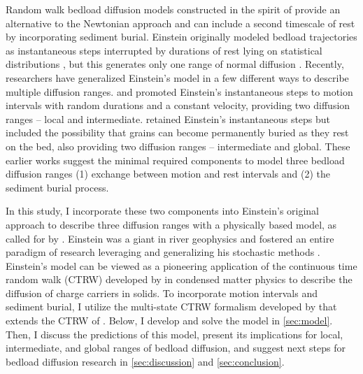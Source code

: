 Random walk bedload diffusion models constructed in the spirit of \citet{Einstein1937} provide an alternative to the Newtonian approach and can include a second timescale of rest by incorporating sediment burial.
Einstein originally modeled bedload trajectories as instantaneous steps interrupted by durations of rest lying on statistical distributions \citep{Hassan1991}, but this generates only one range of normal diffusion \citep{Einstein1937,Hubbell1964,Nakagawa1976}.
Recently, researchers have generalized Einstein's model in a few different ways to describe multiple diffusion ranges.
\citet{Lisle1998} and \citet{Lajeunesse2017} promoted Einstein's instantaneous steps to motion intervals with random durations and a constant velocity, providing two diffusion ranges -- local and intermediate.
\citet{Wu2019} retained Einstein's instantaneous steps but included the possibility that grains can become permanently buried as they rest on the bed, also providing two diffusion ranges -- intermediate and global. 
These earlier works suggest the minimal required components to model three bedload diffusion ranges \DIFdelbegin \DIFdel{: }\DIFdelend \DIFaddbegin {}\DIFaddend (1) exchange between motion and rest intervals and (2) the sediment burial process.

In this study, I incorporate these two components into Einstein's original approach to describe three diffusion ranges with a physically based model, as called for by \citet{Nikora2002}.
Einstein was a giant in river geophysics and fostered an entire paradigm of research leveraging and generalizing his stochastic methods \citep{Hubbell1964, Yano1969, Yang1971, Gordon1972, Nakagawa1976,Paintal1971}.
Einstein's model can be viewed as a pioneering application of the continuous time random walk (CTRW) developed by \citet{Montroll1965} in condensed matter physics to describe the diffusion of charge carriers in solids.
To incorporate motion intervals and sediment burial, I utilize the multi-state CTRW formalism developed by \citet{Weiss1976, Weiss1994} that extends the CTRW of \citet{Montroll1965}.
Below, I develop and solve the model in \DIFdelbegin {}\DIFdelend \DIFaddbegin {}\DIFaddend \ref{sec:model}. Then, I discuss the predictions of this model, present its implications for local, intermediate, and global ranges of bedload diffusion, and suggest next steps for bedload diffusion research in \DIFdelbegin {}\DIFdelend \DIFaddbegin {}\DIFaddend \ref{sec:discussion} and \ref{sec:conclusion}.

